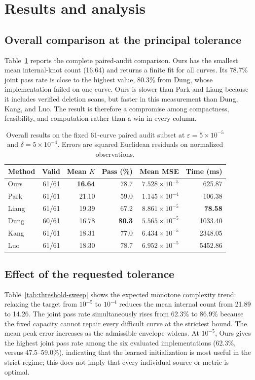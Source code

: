 \documentclass[preprint,12pt]{elsarticle}
\begin{document}
\section{Results and analysis}
\subsection{Overall comparison at the principal tolerance}
Table~\ref{tab:overall-results} reports the complete paired-audit comparison. Ours
has the smallest mean internal-knot count (16.64) and returns a finite fit for
all curves. Its 78.7\% joint pass rate is close to the highest value, 80.3\%
from Dung, whose implementation failed on one curve. Ours is slower than Park
and Liang because it includes verified deletion scans, but faster in this
measurement than Dung, Kang, and Luo. The result is therefore a compromise
among compactness, feasibility, and computation rather than a win in every
column.

\begin{table}[t]
\centering
\caption{Overall results on the fixed 61-curve paired audit subset at
$\varepsilon=5\times10^{-5}$ and $\delta=5\times10^{-4}$. Errors are squared
Euclidean residuals on normalized observations.}
\label{tab:overall-results}
\begin{tabular}{lrrrrr}
\toprule
Method & Valid & Mean $K$ & Pass (\%) & Mean MSE & Time (ms) \\
\midrule
Ours  & 61/61 & \textbf{16.64} & 78.7 & $7.528\times10^{-5}$ & 625.87 \\
Park  & 61/61 & 21.10 & 59.0 & $1.145\times10^{-4}$ & 106.38 \\
Liang & 61/61 & 19.39 & 67.2 & $8.861\times10^{-5}$ & \textbf{78.58} \\
Dung  & 60/61 & 16.78 & \textbf{80.3} & \textbf{$5.565\times10^{-5}$} & 1033.40 \\
Kang  & 61/61 & 18.31 & 77.0 & $6.434\times10^{-5}$ & 2348.05 \\
Luo   & 61/61 & 18.30 & 78.7 & $6.952\times10^{-5}$ & 5452.86 \\
\bottomrule
\end{tabular}
\end{table}

\subsection{Effect of the requested tolerance}
Table~\ref{tab:threshold-sweep} shows the expected monotone complexity trend:
relaxing the target from $10^{-5}$ to $10^{-4}$ reduces the mean internal count
from 21.89 to 14.26. The joint pass rate simultaneously rises from 62.3\% to
86.9\% because the fixed capacity cannot repair every difficult curve at the
strictest bound. The mean peak error increases as the admissible envelope
widens. At $10^{-5}$, Ours gives the highest joint pass rate among the six
evaluated implementations (62.3\%, versus 47.5--59.0\%), indicating that the
learned initialization is most useful in the strict regime; this does not imply
that every individual source or metric is optimal.
\end{document}

